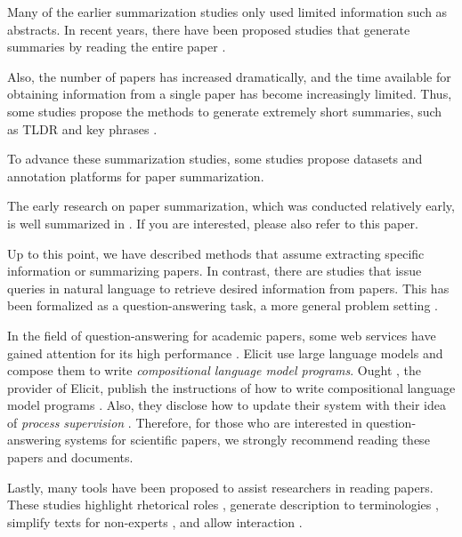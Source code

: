 \documentclass{article}
\begin{document}
Many of the earlier summarization studies only used limited information such as abstracts. In recent years, there have been proposed studies that generate summaries by reading the entire paper \cite{subramanian2019extractive,qi2022sapgraph,dong2020discourse,tretyak2020combination}.

Also, the number of papers has increased dramatically, and the time available for obtaining information from a single paper has become increasingly limited. Thus, some studies propose the methods to generate extremely short summaries, such as TLDR \cite{cachola2020tldr} and key phrases \cite{boudin2021keyphrase,garg2021keyphrase}.

To advance these summarization studies, some studies propose datasets \cite{yasunaga2019scisummnet,bastan2022sume} and annotation platforms \cite{el2022platform} for paper summarization. 

The early research on paper summarization, which was conducted relatively early, is well summarized in \cite{altmami2022automatic}. If you are interested, please also refer to this paper.

Up to this point, we have described methods that assume extracting specific information or summarizing papers. In contrast, there are studies that issue queries in natural language to retrieve desired information from papers. This has been formalized as a question-answering task, a more general problem setting \cite{lu2022learn,ruggeri2022argscichat,saikh2022scienceqa}. 

In the field of question-answering for academic papers, some web services have gained attention for its high performance \cite{elicit,scispace}. Elicit use large language models and compose them to write \textit{compositional language model programs}. Ought \cite{ought}, the provider of Elicit, publish the instructions of how to write compositional language model programs \cite{primer2022}. Also, they disclose how to update their system with their idea of \textit{process supervision} \cite{reppert2023iterated}. Therefore, for those who are interested in question-answering systems for scientific papers, we strongly recommend reading these papers and documents.

Lastly, many tools have been proposed to assist researchers in reading papers. These studies highlight rhetorical roles \cite{fok2023scim,lauscher2018arguminsci}, generate description to terminologies \cite{august2022generating,head2021augmenting,murthy2022accord}, simplify texts for non-experts \cite{august2022paper,jeblick2022chatgpt}, and allow interaction \cite{kang2022threddy,elicit,scispace}.
\end{document}
